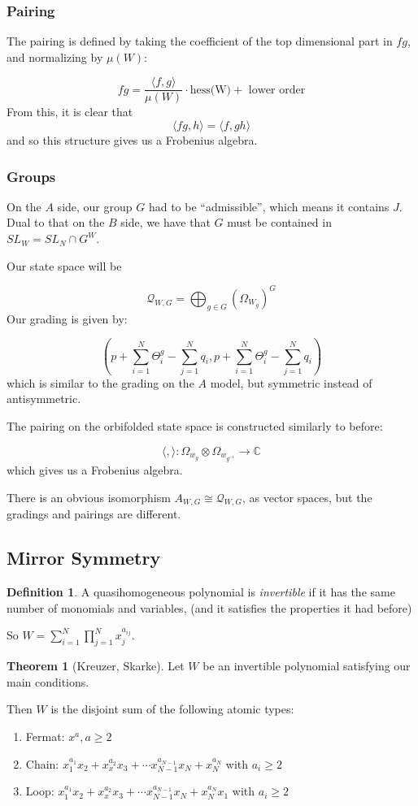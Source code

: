 \documentclass{amsart}
\theoremstyle{definition}
\newtheorem{theorem}[dummy]{Theorem}
\newtheorem{definition}[dummy]{Definition}
\newcommand{\C}{\mathbb{C}}
\begin{document}
\subsubsection{Pairing}
The pairing is defined by taking the coefficient of the top dimensional part in $fg$, and normalizing by $\mu(W)$:

$$fg=\frac{\langle f, g\rangle}{\mu(W)}\cdot\text{hess(W)}+ \text{ lower order}$$
From this, it is clear that
$$\langle fg,h\rangle=\langle f, gh\rangle$$
and so this structure gives us a Frobenius algebra.


\subsubsection{Groups}

On the $A$ side, our group $G$ had to be ``admissible'', which means it contains $J$.  Dual to that on the $B$ side, we have that $G$ must be contained in $SL_W=SL_N\cap G^W$.

Our state space will be

$$\mathcal{Q}_{W,G}=\bigoplus_{g\in G} \left(\Omega_{W_g}\right)^G$$
Our grading is given by:

$$(p+\sum_{i=1}^N \Theta_i^g-\sum_{j=1}^N q_i, p+\sum_{i=1}^N \Theta_i^g-\sum_{j=1}^N q_i)$$
which is similar to the grading on the $A$ model, but symmetric instead of antisymmetric.

The pairing on the orbifolded state space is constructed similarly to before:

$$\langle,\rangle:\Omega_{w_g}\otimes\Omega_{w_{g^{-1}}}\to\C$$
which gives us a Frobenius algebra.

There is an obvious isomorphism $A_{W,G}\cong \mathcal{Q}_{W,G}$, as vector spaces, but the gradings and pairings are different.

\subsection{Mirror Symmetry}

\begin{definition}
A quasihomogeneous polynomial is \emph{invertible} if it has the same number of monomials and variables, (and it satisfies the properties it had before)
\end{definition}

So $W=\sum_{i=1}^N\prod_{j=1}^N x_j^{a_{ij}}$.

\begin{theorem}[Kreuzer, Skarke]
Let $W$ be an invertible polynomial satisfying our main conditions.

Then $W$ is the disjoint sum of the following atomic types:
\begin{enumerate}
\item Fermat: $x^a, a\geq 2$
\item Chain: $x_1^{a_1}x_2+x_x^{a_2}x_3+\cdots x_{N-1}^{a_{N-1}}x_N+x_N^{a_N}$ with $a_i\geq 2$
\item Loop: $x_1^{a_1}x_2+x_x^{a_2}x_3+\cdots x_{N-1}^{a_{N-1}}x_N+x_N^{a_N}x_1$ with $a_i\geq 2$
\end{enumerate}

\end{theorem}
\end{document}
